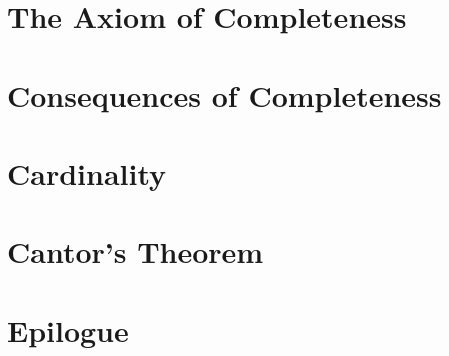 \documentclass[class=understanding-analysis,crop=false]{standalone}
\begin{document}
\section{The Axiom of Completeness}

\section{Consequences of Completeness}

\section{Cardinality}

\section{Cantor's Theorem}

\section{Epilogue}
\end{document}
